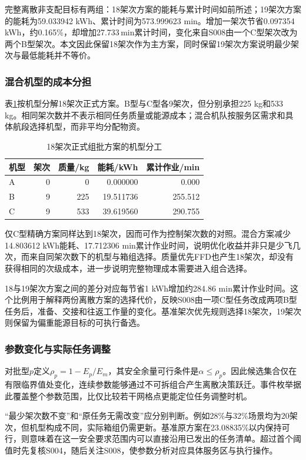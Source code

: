 \documentclass[withoutpreface,colorprint]{format}
\numberwithin{equation}{section}
\numberwithin{figure}{section}
\numberwithin{table}{section}
\begin{document}
完整离散非支配目标有两组：18架次方案的能耗与累计时间如前所述；19架次方案的能耗为59.033942 kWh、累计时间为573.999623 min。增加一架次节省0.097354\,kWh，约0.165\%，却增加27.733\,min累计时间，变化来自S008由一个C型架次改为两个B型架次。本文因此保留18架次作为主方案，同时保留19架次方案说明最少架次与最低能耗并不等价。


\subsubsection{混合机型的成本分担}
表\ref{tab:rev_q1_types}按机型分解18架次正式方案。B型与C型各9架次，但分别承担225 kg和533 kg。相同架次数并不表示相同任务质量或能源成本；混合机队按服务区需求和具体航段选择机型，而非平均分配物资。

\begin{table}[htbp]\centering\small
\caption{18架次正式组批方案的机型分工}\label{tab:rev_q1_types}
\begin{tabular}{lrrrr}\toprule
机型 & 架次 & 质量/kg & 能耗/kWh & 累计作业/min\\\midrule
A & 0 & 0 & 0.000000 & 0.000\\
B & 9 & 225 & 19.511736 & 255.512\\
C & 9 & 533 & 39.619560 & 290.755\\
\bottomrule\end{tabular}
\end{table}


仅C型精确方案同样达到18架次，因而可作为控制架次数的对照。混合方案减少14.803612 kWh能耗、17.712306 min累计作业时间，说明优化收益并非只是少飞几次，而来自同架次数下的机型与箱组选择。质量优先FFD也产生18架次，却没有获得相同的次级成本，进一步说明完整物理成本需要进入组合选择。

18与19架次方案之间的差分对应每节省1 kWh增加约284.86 min累计作业时间。这个比例用于解释两份离散方案的选择代价，反映S008由一项C型任务改成两项B型任务后，准备、交接和往返工作量的变化。基准架次优先规则选择18架次，19架次则保留为偏重能源目标的可执行备选。

\subsubsection{参数变化与实际任务调整}
对批型$p$定义$\rho_p=1-E_p/E_m$，其安全余量可行条件是$\alpha\le\rho_p$。因此候选集合仅在有限临界值处变化，连续参数能够通过不可拆组合产生离散决策跃迁。事件枚举据此覆盖整个参数范围，比仅比较若干网格点更能定位任务调整时机。

“最少架次数不变”和“原任务无需改变”应分别判断。例如28\%与32\%场景均为20架次，但机型构成不同，实际箱组仍需更新。基准原方案在23.08835\%以内保持可行，则意味着在这一安全要求范围内可以直接沿用已发出的任务清单。超过首个阈值时先复核S004，随后关注S008，使参数分析对应具体服务区与执行操作。
\end{document}
